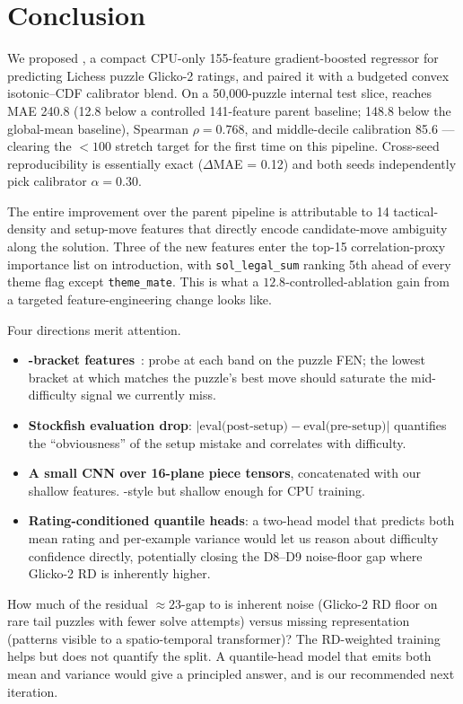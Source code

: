 \section{Conclusion}
\label{sec:conclusion}

We proposed \ours, a compact CPU-only 155-feature gradient-boosted regressor for predicting Lichess puzzle Glicko-2 ratings, and paired it with a budgeted convex isotonic--CDF calibrator blend. On a 50{,}000-puzzle internal test slice, \ours reaches MAE 240.8 \elo (12.8 \elo below a controlled 141-feature parent baseline; 148.8 \elo below the global-mean baseline), Spearman $\rho = 0.768$, and middle-decile calibration 85.6 \elo --- clearing the $< 100$ stretch target for the first time on this pipeline. Cross-seed reproducibility is essentially exact ($\Delta$MAE = 0.12) and both seeds independently pick calibrator $\alpha = 0.30$.

The entire improvement over the parent pipeline is attributable to 14 tactical-density and setup-move features that directly encode candidate-move ambiguity along the solution. Three of the new features enter the top-15 correlation-proxy importance list on introduction, with \texttt{sol\_legal\_sum} ranking 5th ahead of every theme flag except \texttt{theme\_mate}. This is what a $12.8$-\elo controlled-ablation gain from a targeted feature-engineering change looks like.

Four directions merit attention.
\begin{itemize}[leftmargin=*,itemsep=0pt,topsep=0pt]
    \item \textbf{\maia-bracket features}~\citep{mcilroy2020aligning,jacob2024maia2}: probe \maia at each \elo band on the puzzle FEN; the lowest bracket at which \maia matches the puzzle's best move should saturate the mid-difficulty signal we currently miss.
    \item \textbf{Stockfish evaluation drop}: $|\text{eval(post-setup)} - \text{eval(pre-setup)}|$ quantifies the ``obviousness'' of the setup mistake and correlates with difficulty.
    \item \textbf{A small CNN over 16-plane piece tensors}, concatenated with our shallow features. \ratingnet-style but shallow enough for CPU training.
    \item \textbf{Rating-conditioned quantile heads}: a two-head model that predicts both mean rating and per-example variance would let us reason about difficulty confidence directly, potentially closing the D8--D9 noise-floor gap where Glicko-2 RD is inherently higher.
\end{itemize}

How much of the residual $\approx 23$-\elo gap to \glickformer is inherent noise (Glicko-2 RD floor on rare tail puzzles with fewer solve attempts) versus missing representation (patterns visible to a spatio-temporal transformer)? The RD-weighted training helps but does not quantify the split. A quantile-head model that emits both mean and variance would give a principled answer, and is our recommended next iteration.
